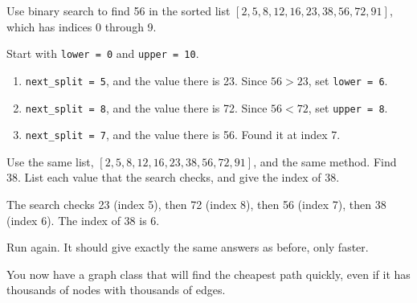 \begin{Worked}
\begin{Problem}
Use binary search to find 56 in the sorted list $[2, 5, 8, 12, 16, 23, 38, 56, 72, 91]$, which has indices 0 through 9.
\end{Problem}
\begin{Solution}
Start with \texttt{lower = 0} and \texttt{upper = 10}.
\begin{enumerate}
\item \texttt{next\_split = 5}, and the value there is 23. Since $56 > 23$, set \texttt{lower = 6}.
\item \texttt{next\_split = 8}, and the value there is 72. Since $56 < 72$, set \texttt{upper = 8}.
\item \texttt{next\_split = 7}, and the value there is 56. Found it at index 7.
\end{enumerate}
\end{Solution}
\end{Worked}

\begin{Exercise}[title={Binary Search Steps}, label=bsearch1]
Use the same list, $[2, 5, 8, 12, 16, 23, 38, 56, 72, 91]$, and the same method. Find 38. List each value that the search checks, and give the index of 38.
\end{Exercise}
\begin{Answer}[ref=bsearch1]
The search checks 23 (index 5), then 72 (index 8), then 56 (index 7), then 38 (index 6). The index of 38 is 6.
\end{Answer}

Run  again. It should give exactly the same answers as before, only faster.

You now have a graph class that will find the cheapest path quickly,
even if it has thousands of nodes with thousands of edges.
